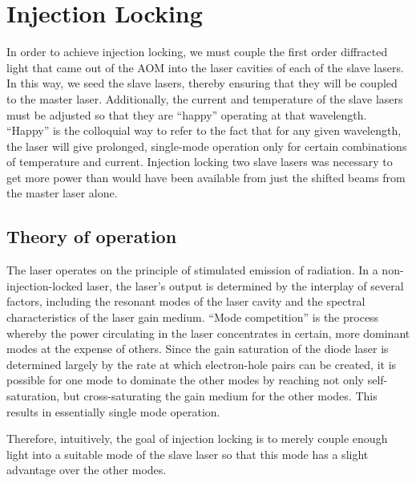  \chapter{Injection Locking}\label{InjectionLockingChapter}


In order to achieve injection locking, we must couple the first order diffracted light that came out of the AOM into the laser cavities of each of the slave lasers. In this way, we seed the slave lasers, thereby ensuring that they will be coupled to the master laser. Additionally, the current and temperature of the slave lasers must be adjusted so that they are ``happy'' operating at that wavelength. ``Happy'' is the colloquial way to refer to the fact that for any given wavelength, the laser will give prolonged, single-mode operation only for certain combinations of temperature and current. 
Injection locking two slave lasers was necessary to get more power than would have been available from just the shifted beams from the master laser alone. 

\section{Theory of operation}


The laser operates on the principle of stimulated emission of radiation. In a non-injection-locked laser, the laser's output is determined by the interplay of several factors, including the resonant modes of the laser cavity and the spectral characteristics of the laser gain medium.
``Mode competition'' is the process whereby the power circulating in the laser concentrates in certain, more dominant modes at the expense of others. Since the gain saturation of the diode laser is determined largely by the rate at which electron-hole pairs can be created, it is possible for one mode to dominate the other modes by reaching not only self-saturation, but cross-saturating the gain medium for the other modes\cite{RPPhotonicsEncyclopediaAndBuyersGuide}. This results in essentially single mode operation. 

Therefore, intuitively, the goal of injection locking is to merely couple enough light into a suitable mode of the slave laser so that this mode has a slight advantage over the other modes. 

